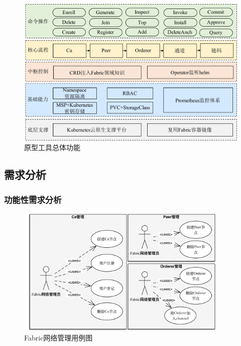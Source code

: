 \begin{figure}[!htbp] %
    \centering %
    \includegraphics[width=1.0\textwidth]{FIGs/chapter4/tool.pdf} %
    \caption{原型工具总体功能} %
    \label{toolstotal} %
\end{figure}%



\subsection{需求分析} \label{section: requirement}

\subsubsection{功能性需求分析}

\begin{figure}[!htbp] %
    \centering %
    \includegraphics[width=0.9\textwidth]{FIGs/chapter4/fabric_use_case.pdf} %
    \caption{Fabric网络管理用例图} %
    \label{fabric_use_case} %
\end{figure}%


